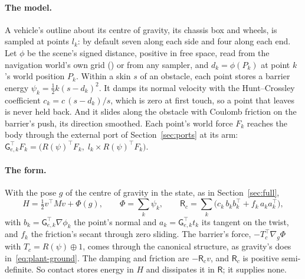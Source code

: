 \documentclass[11pt]{article}
\theoremstyle{remark}
\newcommand{\R}{\mathsf R}
\newcommand{\G}{\mathsf G}
\newcommand{\T}{^{\top}}
\begin{document}
\paragraph{The model.} A vehicle's outline about its centre of gravity, its chassis box and wheels,
is sampled at points $l_k$: by default seven along each side and four along each end. Let $\phi$ be
the scene's signed distance, positive in free space, read from the navigation world's own grid
() or from any sampler, and $d_k=\phi(P_k)$ at point $k$'s world
position $P_k$. Within a skin $s$ of an obstacle, each point stores a barrier energy
$\psi_k=\tfrac12k(s-d_k)^2$. It damps its normal velocity with the Hunt--Crossley coefficient
$c_k=c\,(s-d_k)/s$, which is zero at first touch, so a point that leaves is never held back. And it
slides along the obstacle with Coulomb friction on the barrier's push, its direction smoothed. Each
point's world force $F_k$ reaches the body through the external port of Section~\ref{sec:ports} at
its arm: $\G_{e,k}\T F_k=\big(R(\psi)\T F_k,\;l_k\times R(\psi)\T F_k\big)$.

\paragraph{The form.} With the pose $g$ of the centre of gravity in the state, as in
Section~\ref{sec:full},
\begin{equation}
  H=\tfrac12v\T Mv+\Phi(g),\qquad \Phi=\textstyle\sum_k\psi_k,\qquad
  \R_c=\textstyle\sum_k\big(c_k\,b_kb_k\T+f_k\,a_ka_k\T\big),
  \label{eq:contact}
\end{equation}
with $b_k=\G_{e,k}\T\nabla\phi_k$ the point's normal and $a_k=\G_{e,k}\T t_k$ its tangent on the
twist, and $f_k$ the friction's secant through zero sliding. The barrier's force,
$-T_c\T\nabla_g\Phi$ with $T_c=R(\psi)\oplus1$, comes through the canonical structure, as gravity's
does in~\eqref{eq:plant-ground}. The damping and friction are $-\R_cv$, and $\R_c$ is positive
semi-definite. So contact stores energy in $H$ and dissipates it in $\R$; it supplies none.
\end{document}
